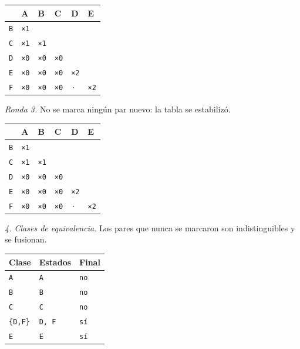 \documentclass[11pt]{article}
\begin{document}
\begin{center}\footnotesize\begin{tabular}{llllll}\toprule
 & A & B & C & D & E \\\midrule
\texttt{B} & \texttt{×1} & \texttt{} & \texttt{} & \texttt{} & \texttt{} \\
\texttt{C} & \texttt{×1} & \texttt{×1} & \texttt{} & \texttt{} & \texttt{} \\
\texttt{D} & \texttt{×0} & \texttt{×0} & \texttt{×0} & \texttt{} & \texttt{} \\
\texttt{E} & \texttt{×0} & \texttt{×0} & \texttt{×0} & \texttt{×2} & \texttt{} \\
\texttt{F} & \texttt{×0} & \texttt{×0} & \texttt{×0} & \texttt{·} & \texttt{×2} \\
\bottomrule\end{tabular}\end{center}
\textit{Ronda 3.} No se marca ningún par nuevo: la tabla se estabilizó.
\begin{center}\footnotesize\begin{tabular}{llllll}\toprule
 & A & B & C & D & E \\\midrule
\texttt{B} & \texttt{×1} & \texttt{} & \texttt{} & \texttt{} & \texttt{} \\
\texttt{C} & \texttt{×1} & \texttt{×1} & \texttt{} & \texttt{} & \texttt{} \\
\texttt{D} & \texttt{×0} & \texttt{×0} & \texttt{×0} & \texttt{} & \texttt{} \\
\texttt{E} & \texttt{×0} & \texttt{×0} & \texttt{×0} & \texttt{×2} & \texttt{} \\
\texttt{F} & \texttt{×0} & \texttt{×0} & \texttt{×0} & \texttt{·} & \texttt{×2} \\
\bottomrule\end{tabular}\end{center}
\textit{4. Clases de equivalencia.} Los pares que nunca se marcaron son indistinguibles y se fusionan.
\begin{center}\footnotesize\begin{tabular}{lll}\toprule
Clase & Estados & Final \\\midrule
\texttt{A} & \texttt{A} & \texttt{no} \\
\texttt{B} & \texttt{B} & \texttt{no} \\
\texttt{C} & \texttt{C} & \texttt{no} \\
\texttt{\{D,F\}} & \texttt{D, F} & \texttt{sí} \\
\texttt{E} & \texttt{E} & \texttt{sí} \\
\bottomrule\end{tabular}\end{center}
\end{document}
